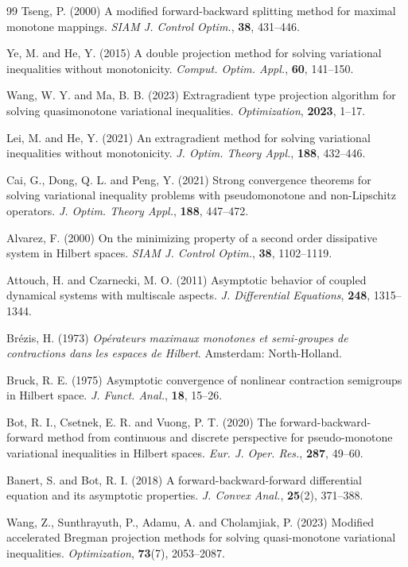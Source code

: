 \documentclass[hidelinks,11 pt]{article}
\numberwithin{equation}{section}
\theoremstyle{definition}  %
\numberwithin{equation}{section}
\numberwithin{theorem}{section}
\begin{document}
\begin{thebibliography}{99}
Tseng, P. (2000) A modified forward-backward splitting method for maximal monotone mappings. \textit{SIAM J. Control Optim.}, \textbf{38}, 431--446.

Ye, M. and He, Y. (2015) A double projection method for solving variational inequalities without monotonicity. \textit{Comput. Optim. Appl.}, \textbf{60}, 141--150.

Wang, W. Y. and Ma, B. B. (2023) Extragradient type projection algorithm for solving quasimonotone variational inequalities. \textit{Optimization}, \textbf{2023}, 1--17.

Lei, M. and He, Y. (2021) An extragradient method for solving variational inequalities without monotonicity. \textit{J. Optim. Theory Appl.}, \textbf{188}, 432--446.

Cai, G., Dong, Q. L. and Peng, Y. (2021) Strong convergence theorems for solving variational inequality problems with pseudomonotone and non-Lipschitz operators. \textit{J. Optim. Theory Appl.}, \textbf{188}, 447--472.

Alvarez, F. (2000) On the minimizing property of a second order dissipative system in Hilbert spaces. \textit{SIAM J. Control Optim.}, \textbf{38}, 1102--1119.

Attouch, H. and Czarnecki, M. O. (2011) Asymptotic behavior of coupled dynamical systems with multiscale aspects. \textit{J. Differential Equations}, \textbf{248}, 1315--1344.

Brézis, H. (1973) \textit{Opérateurs maximaux monotones et semi-groupes de contractions dans les espaces de Hilbert}. Amsterdam: North-Holland.

Bruck, R. E. (1975) Asymptotic convergence of nonlinear contraction semigroups in Hilbert space. \textit{J. Funct. Anal.}, \textbf{18}, 15--26.

Bot, R. I., Csetnek, E. R. and Vuong, P. T. (2020) The forward-backward-forward method from continuous and discrete perspective for pseudo-monotone variational inequalities in Hilbert spaces. \textit{Eur. J. Oper. Res.}, \textbf{287}, 49--60.

Banert, S. and Bot, R. I. (2018) A forward-backward-forward differential equation and its asymptotic properties. \textit{J. Convex Anal.}, \textbf{25}(2), 371--388.

Wang, Z., Sunthrayuth, P., Adamu, A. and Cholamjiak, P. (2023) Modified accelerated Bregman projection methods for solving quasi-monotone variational inequalities. \textit{Optimization}, \textbf{73}(7), 2053--2087.


\end{thebibliography}
\end{document}
